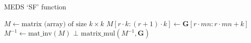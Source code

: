 \begin{algorithm}
  \caption{MEDS `SF' function}
  \label{alg:medssffunction}
  \begin{algorithmic}
      \State $M \gets \text{matrix (array) of size } k \times k$
        \State $M[r \cdot k:(r+1) \cdot k] \gets \textbf{G}[r \cdot mn:r \cdot mn + k]$
      \EndFor
      \State $M^{-1} \gets \text{mat\_inv}(M)$
        \State \Return $\bot$
      \EndIf
      \State \Return $\text{matrix\_mul}(M^{-1}, \textbf{G})$
    \EndFunction
  \end{algorithmic}
\end{algorithm}